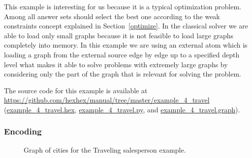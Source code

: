 \documentclass[a4paper, titlepage]{article}
\newcommand{\examplelink}[1]{\url{https://github.com/hexhex/manual/tree/master/#1}}
\newcommand{\exampledownloadlink}[2]{\href{https://github.com/hexhex/manual/raw/master/#1}{#2}}
\begin{document}
This example is interesting for us because it is a typical 
optimization problem. Among all answer sets \dlvhex{} 
should select the best one according to the weak constraints 
concept explained in Section~\ref{optimize}. In the 
classical solver we are able to load only small graphs 
because it is not feasible to load large graphs completely into memory.
In this example we are using an external atom which is loading 
a graph from the external source edge by edge up to a specified 
depth level what makes it able to solve problems with 
extremely large graphs by considering only the part of the graph
that is relevant for solving the problem. 

The source code for this example is available at
\examplelink{example_4_travel}
(\exampledownloadlink{example_4_travel/example_4_travel.hex}{example\_4\_travel.hex},
\exampledownloadlink{example_4_travel/example_4_travel.py}{example\_4\_travel.py},
and
\exampledownloadlink{example_4_travel/example_4_travel.graph}{example\_4\_travel.graph}).

\subsubsection{Encoding}

\begin{figure}%
\begin{center}%
%
\end{center}%
\caption{Graph of cities for the Traveling salesperson example.}
\label{fig:travelcities}
\end{figure}
\end{document}
